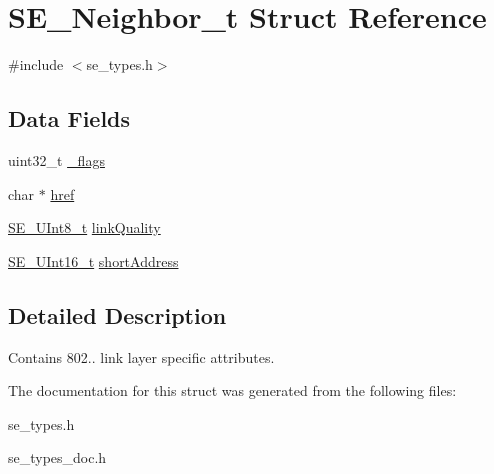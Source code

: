 \hypertarget{structSE__Neighbor__t}{}\section{S\+E\+\_\+\+Neighbor\+\_\+t Struct Reference}
\label{structSE__Neighbor__t}


{\ttfamily \#include $<$se\+\_\+types.\+h$>$}

\subsection*{Data Fields}
\begin{DoxyCompactItemize}
\item 
uint32\+\_\+t \hyperlink{group__Neighbor_ga0518ed6ff88d279fae8395c91ddbb35f}{\+\_\+flags}
\item 
char $\ast$ \hyperlink{group__Neighbor_gad4838ad5ed4427be8519b653f9bf1d19}{href}
\item 
\hyperlink{group__UInt8_gaf7c365a1acfe204e3a67c16ed44572f5}{S\+E\+\_\+\+U\+Int8\+\_\+t} \hyperlink{group__Neighbor_gab26edd9f3b909788d724f45d6d7cd831}{link\+Quality}
\item 
\hyperlink{group__UInt16_gac68d541f189538bfd30cfaa712d20d29}{S\+E\+\_\+\+U\+Int16\+\_\+t} \hyperlink{group__Neighbor_ga76779342274466f668ade7f1d80148ae}{short\+Address}
\end{DoxyCompactItemize}


\subsection{Detailed Description}
Contains 802.. link layer specific attributes. 

The documentation for this struct was generated from the following files\+:\begin{DoxyCompactItemize}
\item 
se\+\_\+types.\+h\item 
se\+\_\+types\+\_\+doc.\+h\end{DoxyCompactItemize}
